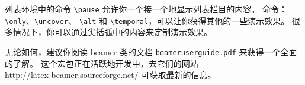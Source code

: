 
列表环境中的命令 \verb|\pause| 允许你一个接一个地显示列表栏目的内容。
命令：\verb|\only|、\verb|\uncover|、
\verb|\alt| 和 \verb|\temporal|，可以让你获得其他的一些演示效果。
很多情况下，你可以通过尖括弧中的内容来定制演示效果。


无论如何，建议你阅读 beamer 类的文档 \texttt{beameruserguide.pdf} 来获得一个全面的了解。
这个宏包正在活跃地开发中，去它们的网站\\
\href{http://latex-beamer.sourceforge.net/}{http://latex-beamer.sourceforge.net/}
可获取最新的信息。
